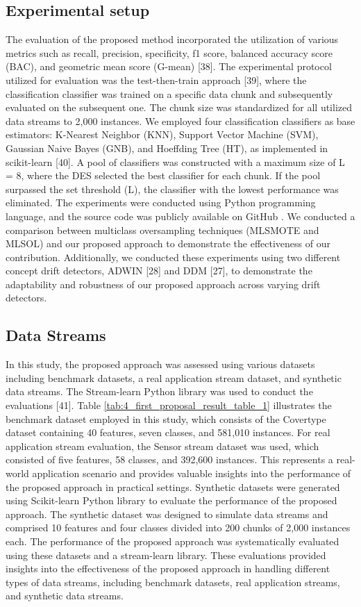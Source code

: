 \subsection{Experimental setup}
The evaluation of the proposed method incorporated the utilization of various metrics such as recall, precision, specificity, f1 score, balanced accuracy score (BAC), and geometric mean score (G-mean) [38]. The experimental protocol utilized for evaluation was the test-then-train approach [39], where the classification classifier was trained on a specific data chunk and subsequently evaluated on the subsequent one. The chunk size was standardized for all utilized data streams to 2,000 instances. We employed four classification classifiers as base estimators: K-Nearest Neighbor (KNN), Support Vector Machine (SVM), Gaussian Naive Bayes (GNB), and Hoeffding Tree (HT), as implemented in scikit-learn [40]. A pool of classifiers was constructed with a maximum size of L = 8, where the DES selected the best classifier for each chunk. If the pool surpassed the set threshold (L), the classifier with the lowest performance was eliminated. The experiments were conducted using Python programming language, and the source code was publicly available on GitHub . We conducted a comparison between multiclass oversampling techniques (MLSMOTE and MLSOL) and our proposed approach to demonstrate the effectiveness of our contribution. Additionally, we conducted these experiments using two different concept drift detectors, ADWIN [28] and DDM [27], to demonstrate the adaptability and robustness of our proposed approach across varying drift detectors.

\subsection{Data Streams}
In this study, the proposed approach was assessed using various datasets including benchmark datasets, a real application stream dataset, and synthetic data streams. The Stream-learn Python library was used to conduct the evaluations [41]. Table \ref{tab:4_first_proposal_result_table_1} illustrates the benchmark dataset employed in this study, which consists of the Covertype dataset containing 40 features, seven classes, and 581,010 instances. For real application stream evaluation, the Sensor stream dataset was used, which consisted of five features, 58 classes, and 392,600 instances. This represents a real-world application scenario and provides valuable insights into the performance of the proposed approach in practical settings. Synthetic datasets were generated using Scikit-learn Python library to evaluate the performance of the proposed approach. The synthetic dataset was designed to simulate data streams and comprised 10 features and four classes divided into 200 chunks of 2,000 instances each. The performance of the proposed approach was systematically evaluated using these datasets and a stream-learn library. These evaluations provided insights into the effectiveness of the proposed approach in handling different types of data streams, including benchmark datasets, real application streams, and synthetic data streams.

